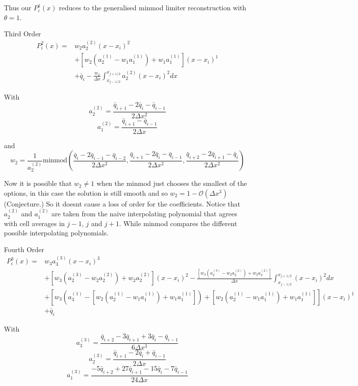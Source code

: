 \documentclass[10pt]{article}
\newcommand\minmod{\text{minmod}}
\begin{document}
Thus our $P^1_i(x)$ reduces to the generalised minmod limiter reconstruction with $\theta = 1$. 




Third Order
\begin{align*}
P^2_i(x) =& w_2a^{(2)}_2(x  - x_i)^2 \\
&+ \left[w_2\left(a^{(1)}_2 - w_1a^{(1)}_1\right) + w_1a^{(1)}_1\right](x  - x_i)^1 \\
&+ \bar{q}_i  - \frac{ w_2}{\Delta x}\int_{x_{j-1/2}}^{x_{j+1/2}}a^{(2)}_2(x  - x_i)^2 dx
\end{align*}

With
\[a^{(2)}_2 = \frac{\bar{q}_{i+1} - 2\bar{q}_{i} - \bar{q}_{i-1}}{2 \Delta x^2} \]
\[a^{(2)}_1 = \frac{\bar{q}_{i+1} - \bar{q}_{i-1}}{2 \Delta x} \]

and
\[w_2 = \frac{1}{a^{(2)}_2} \minmod\left(\frac{\bar{q}_{i} - 2\bar{q}_{i-1} - \bar{q}_{i-2}}{2 \Delta x^2},\frac{\bar{q}_{i+1} - 2\bar{q}_{i} - \bar{q}_{i-1}}{2 \Delta x^2}, \frac{\bar{q}_{i+2} - 2\bar{q}_{i+1} - \bar{q}_{i}}{2 \Delta x^2}\right)\]

Now it is possible that $w_2 \neq 1$ when the minmod just chooses the smallest of the options, in this case the solution is still smooth and so $w_2 = 1 - \mathcal{O}\left(\Delta x^3\right)$ (Conjecture.) So it doesnt cause a loss of order for the coefficients. Notice that $a^{(2)}_2$ and $a^{(2)}_1$ are taken from the naive interpolating polynomial that agrees with cell averages in $j-1$, $j$ and $j+1$. While minmod compares the different possible interpolating polynomials. 

Fourth Order
\begin{align*}
P^3_i(x) = &  w_3a^{(3)}_3(x  - x_i)^3 \\ &+  \left[w_3\left(a^{(3)}_2 - w_2a^{(2)}_2\right) + w_2a^{(2)}_2\right] (x  - x_i)^2 - \frac{\left[w_3\left(a^{(3)}_2 - w_2a^{(2)}_2\right) + w_2a^{(2)}_2\right]}{\Delta x}\int_{x_{j-1/2}}^{x_{j+1/2}}(x  - x_i)^2 dx \\ & + \left[w_3\left(a^{(1)}_3 - \left[w_2\left(a^{(1)}_2 - w_1a^{(1)}_1\right) + w_1a^{(1)}_1\right]\right) + \left[w_2\left(a^{(1)}_2 - w_1a^{(1)}_1\right) + w_1a^{(1)}_1\right]\right](x  - x_i)^1 \\ &+ \bar{q}_i
\end{align*}

With
\[a^{(3)}_3 = \frac{ \bar{q}_{i+2} -3\bar{q}_{i+1} +3 \bar{q}_{i} - \bar{q}_{i-1}}{6 \Delta x^3} \]
\[a^{(3)}_2 = \frac{\bar{q}_{i+1} - 2\bar{q}_{i} + \bar{q}_{i-1}}{2 \Delta x} \]
\[a^{(3)}_1 = \frac{-5\bar{q}_{i+2} + 27\bar{q}_{i+1}  - 15\bar{q}_{i} - 7\bar{q}_{i-1}}{24 \Delta x} \]
\end{document}
